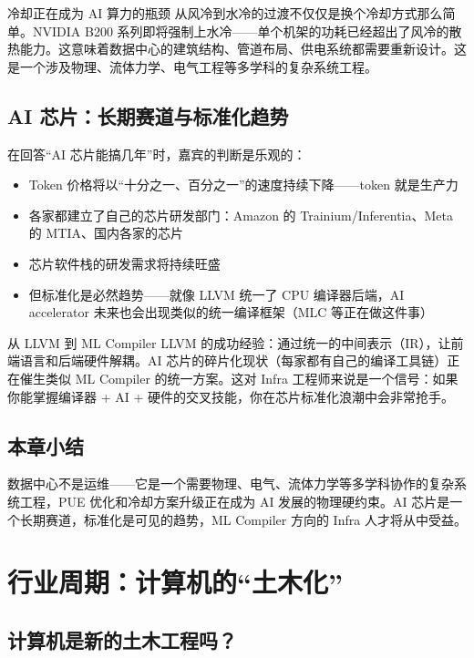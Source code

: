 \begin{importantbox}{冷却正在成为 AI 算力的瓶颈}
从风冷到水冷的过渡不仅仅是换个冷却方式那么简单。NVIDIA B200 系列即将强制上水冷——单个机架的功耗已经超出了风冷的散热能力。这意味着数据中心的建筑结构、管道布局、供电系统都需要重新设计。这是一个涉及物理、流体力学、电气工程等多学科的复杂系统工程。
\end{importantbox}

\subsection{AI 芯片：长期赛道与标准化趋势}

在回答``AI 芯片能搞几年''时，嘉宾的判断是乐观的：

\begin{itemize}
    \item Token 价格将以``十分之一、百分之一''的速度持续下降——token 就是生产力
    \item 各家都建立了自己的芯片研发部门：Amazon 的 Trainium/Inferentia、Meta 的 MTIA、国内各家的芯片
    \item 芯片软件栈的研发需求将持续旺盛
    \item 但标准化是必然趋势——就像 LLVM 统一了 CPU 编译器后端，AI accelerator 未来也会出现类似的统一编译框架（MLC 等正在做这件事）
\end{itemize}

\begin{knowledgebox}{从 LLVM 到 ML Compiler}
LLVM 的成功经验：通过统一的中间表示（IR），让前端语言和后端硬件解耦。AI 芯片的碎片化现状（每家都有自己的编译工具链）正在催生类似 ML Compiler 的统一方案。这对 Infra 工程师来说是一个信号：如果你能掌握编译器 + AI + 硬件的交叉技能，你在芯片标准化浪潮中会非常抢手。
\end{knowledgebox}

\subsection{本章小结}

数据中心不是运维——它是一个需要物理、电气、流体力学等多学科协作的复杂系统工程，PUE 优化和冷却方案升级正在成为 AI 发展的物理硬约束。AI 芯片是一个长期赛道，标准化是可见的趋势，ML Compiler 方向的 Infra 人才将从中受益。


\section{行业周期：计算机的``土木化''}

\subsection{计算机是新的土木工程吗？}

